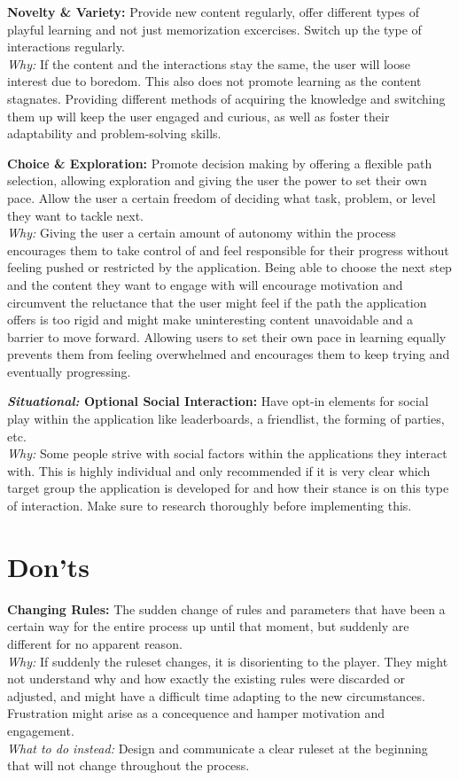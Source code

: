 \textbf{Novelty \& Variety:}
Provide new content regularly, offer different types of playful learning and not just memorization excercises. Switch up the type of interactions regularly. \\ \indent
\textit{Why:} If the content and the interactions stay the same, the user will loose interest due to boredom. This also does not promote learning as the content stagnates. Providing different methods of acquiring the knowledge and switching them up will keep the user engaged and curious, as well as foster their adaptability and problem-solving skills.

\textbf{Choice \& Exploration:}
Promote decision making by offering a flexible path selection, allowing exploration and giving the user the power to set their own pace. Allow the user a certain freedom of deciding what task, problem, or level they want to tackle next. \\ \indent
\textit{Why:} Giving the user a certain amount of autonomy within the process encourages them to take control of and feel responsible for their progress without feeling pushed or restricted by the application. Being able to choose the next step and the content they want to engage with will encourage motivation and circumvent the reluctance that the user might feel if the path the application offers is too rigid and might make uninteresting content unavoidable and a barrier to move forward. Allowing users to set their own pace in learning equally prevents them from feeling overwhelmed and encourages them to keep trying and eventually progressing.

\textbf{\emph{Situational:} Optional Social Interaction:}
Have opt-in elements for social play within the application like leaderboards, a friendlist, the forming of parties, etc. \\ \indent
\textit{Why:} Some people strive with social factors within the applications they interact with. This is highly individual and only recommended if it is very clear which target group the application is developed for and how their stance is on this type of interaction. Make sure to research thoroughly before implementing this.

\section*{Don'ts} \indent
\textbf{Changing Rules:}
The sudden change of rules and parameters that have been a certain way for the entire process up until that moment, but suddenly are different for no apparent reason. \\ \indent
\textit{Why:} If suddenly the ruleset changes, it is disorienting to the player. They might not understand why and how exactly the existing rules were discarded or adjusted, and might have a difficult time adapting to the new circumstances. Frustration might arise as a concequence and hamper motivation and engagement. \\ \indent
\textit{What to do instead:} Design and communicate a clear ruleset at the beginning that will not change throughout the process.

